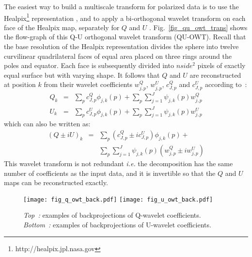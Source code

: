 The easiest way to build a multiscale transform for polarized data is to use the Healpix\footnote{http://healpix.jpl.nasa.gov} 
representation \citep{pixel:healpix}, and to apply a bi-orthogonal wavelet transform on each face of the Healpix map, separately for $Q$ and $U$ \citep{starck:pola09}.
Fig.~\ref{fig_qu_owt_trans} shows the flow-graph of this Q-U orthogonal wavelet transform (QU-OWT). Recall that the base resolution of the Healpix 
representation divides the sphere into twelve curvilinear quadrilateral faces of equal area placed on three rings around the poles and equator. 
Each face is subsequently divided into $nside^{2}$ pixels of exactly equal surface but with varying shape. It follows that $Q$ and $U$ are 
reconstructed at position $k$ from their wavelet coefficients $w_{j,p}^Q$, $w_{j,p}^U$, $c^Q_{J,p}$ and $c^U_{J,p}$ according to~: 
  \begin{eqnarray}
 Q_k &  =  &  \sum_p c^Q_{J,p} \phi_{j,k}(p) + \sum_p \sum_{j=1}^J \psi_{j,k}(p)w_{j,p}^Q \\ \nonumber
 U_k  & =  &  \sum_p c^U_{J,p} \phi_{j,k}(p) + \sum_p \sum_{j=1}^J \psi_{j,k}(p)w_{j,p}^U
 \end{eqnarray}
which can also be written as:
 \begin{eqnarray}
(Q \pm iU)_k & =  & \sum_p (c^Q_{J,p} \pm i c^U_{J,p}) \phi_{j,k}(p) + \nonumber \\
                      &  &  \sum_p \sum_{j=1}^J \psi_{j,k}(p) ( w_{j,p}^Q \pm i w_{j,p}^U )
\label{eq_qu_owt}
\end{eqnarray}
This wavelet transform is not redundant \textit{i.e.} the decomposition has the same number of coefficients as the input data, and it is invertible so that the $Q$ and $U$ maps can be reconstructed exactly.\\

\begin{figure}[htb]
\centerline{
\vbox{
 \texttt{[image: fig\_q\_owt\_back.pdf]}
 \texttt{[image: fig\_u\_owt\_back.pdf]}
}
}
\caption{ \textit{Top~:} examples of backprojections of Q-wavelet coefficients. \textit{Bottom~:} examples of backprojections of U-wavelet coefficients.}
\label{fig_qu_owt_back}
\end{figure}

